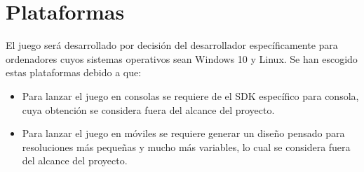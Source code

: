 \section{Plataformas} %

El juego será desarrollado por decisión del desarrollador específicamente para
ordenadores cuyos sistemas operativos sean Windows 10 y Linux. Se han escogido
estas plataformas debido a que:

\begin{itemize}
    \item Para lanzar el juego en consolas se requiere de el SDK específico para
   consola, cuya obtención se considera fuera del alcance del proyecto.
   \item Para lanzar el juego en móviles se requiere generar un diseño pensado
   para resoluciones más pequeñas y mucho más variables, lo cual se considera
   fuera del alcance del proyecto.
\end{itemize}